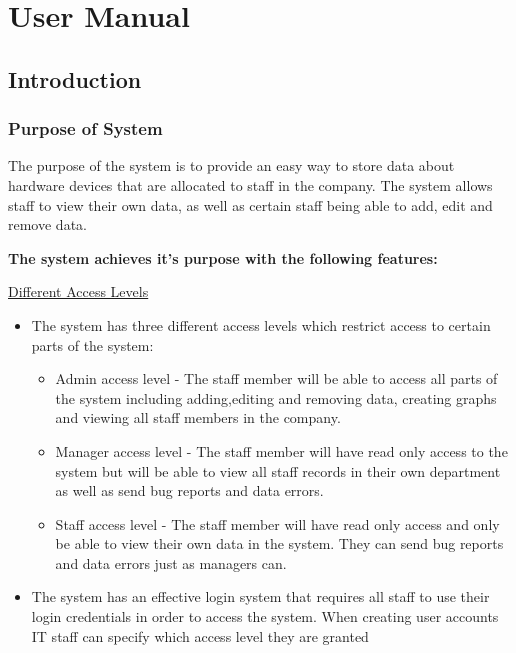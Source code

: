 \chapter{User Manual}

\section{Introduction}

\subsection{Purpose of System}

The purpose of the system is to provide an easy way to store data about hardware devices that are allocated to staff in the company. The system allows staff to view their own data, as well as certain staff being able to add, edit and remove data.

\textbf{The system achieves it's purpose with the following features:}

\underline{Different Access Levels}


\begin{itemize}
\item{The system has three different access levels which restrict access to certain parts of the system:}
	\begin{itemize}
	\item{Admin access level - The staff member will be able to access all parts of the system including adding,editing and removing data, creating graphs and viewing all staff members in the company.}
	\item{Manager access level - The staff member will have read only access to the system but will be able to view all staff records in their own department as well as send bug reports and data errors.}
	\item{Staff access level - The staff member will have read only access and only be able to view their own data in the system. They can send bug reports and data errors just as managers can.}
	\end{itemize}
\item{The system has an effective login system that requires all staff to use their login credentials in order to access the system. When creating user accounts IT staff can specify which access level they are granted}
\end{itemize}

